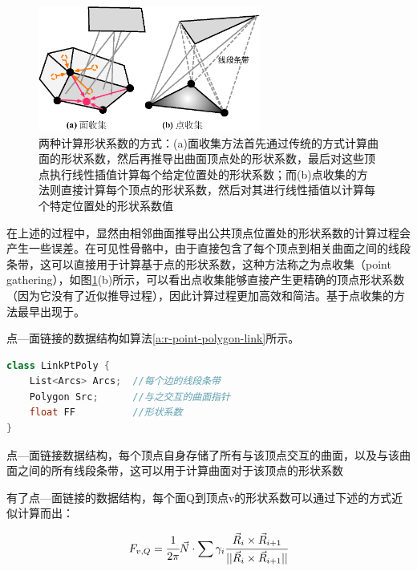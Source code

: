 \begin{figure}
	\sidecaption
	\includegraphics[width=0.65\textwidth]{figures/r/point-gathering}
	\caption{两种计算形状系数的方式：(a)面收集方法首先通过传统的方式计算曲面的形状系数，然后再推导出曲面顶点处的形状系数，最后对这些顶点执行线性插值计算每个给定位置处的形状系数；而(b)点收集的方法则直接计算每个顶点的形状系数，然后对其进行线性插值以计算每个特定位置处的形状系数值}
	\label{f:r-point-gathering}
\end{figure}

在上述的过程中，显然由相邻曲面推导出公共顶点位置处的形状系数的计算过程会产生一些误差。在可见性骨骼中，由于直接包含了每个顶点到相关曲面之间的线段条带，这可以直接用于计算基于点的形状系数，这种方法称之为点收集（point gathering），如图\ref{f:r-point-gathering}(b)所示，可以看出点收集能够直接产生更精确的顶点形状系数（因为它没有了近似推导过程），因此计算过程更加高效和简洁。基于点收集的方法最早出现于\cite{a:Araytracingalgorithmforprogressiveradiosity}。

点—面链接的数据结构如算法\ref{a:r-point-polygon-link}所示。

\begin{algorithm}
\begin{lstlisting}[language=C++, mathescape]
class LinkPtPoly {
	List<Arcs> Arcs;  //每个边的线段条带
	Polygon Src;      //与之交互的曲面指针
	float FF          //形状系数
}
\end{lstlisting}
\caption{点—面链接数据结构，每个顶点自身存储了所有与该顶点交互的曲面，以及与该曲面之间的所有线段条带，这可以用于计算曲面对于该顶点的形状系数}
\label{a:r-point-polygon-link}
\end{algorithm}

有了点—面链接的数据结构，每个面Q到顶点v的形状系数可以通过下述的方式近似计算而出：

\begin{equation}
	F_{v,Q}= \cfrac{1}{2\pi}\vec{N}\cdot\sum\gamma_i \cfrac{\vec{R}_i\times\vec{R}_{i+1}}{||\vec{R}_i\times\vec{R}_{i+1}||}
\end{equation}

